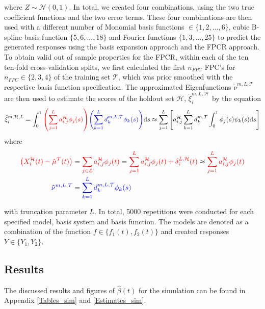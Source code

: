 \documentclass[11pt,twoside,a4paper]{article}
\begin{document}
		where $Z \sim \mathcal{N}(0,1)$. In total, we created four combinations, using the two true coefficient functions and the two error terms. These four combinations are then used with a different number of Monomial basis functions $ \in \{1,2, \dots, 6\}$, cubic B-spline basis-function $\{5,6,...,18\}$ and Fourier functions $\{1,3,...,25\}$ to predict the generated responses using the basis expansion approach and the FPCR approach.
		To obtain valid out of sample properties for the FPCR, within each of the ten ten-fold cross-validation splits, we first calculated the first $n_{FPC}$ FPC's for $n_{FPC} \in \{2,3,4\}$ of the training set $\mathcal{T}$, which was prior smoothed with the respective basis function specification. The approximated Eigenfunctions $\tilde{\nu}^{m, L, \mathcal{T}}$ are then used to estimate the scores of the holdout set $\mathcal{H}$, $\check{\xi}_{i}^{m, L, \mathcal{H}}$  by the equation
		\begin{equation}
			\check{\xi}_{i}^{m, \mathcal{H},L}
			= \int_{0}^{1} {\color{red}\left(\sum_{j = 1}^{L} a_{i,j}^{\mathcal{H}} \phi_j(s)\right)} {\color{blue}\left(\sum_{k = 1}^{L} d_{k}^{m, L, \mathcal{T}} \phi_{k}(s)\right)} \mathrm{d}s
		    \approx \sum_{j = 1}^{L} \left[ a_{i,j}^{\mathcal{H}}\sum_{k = 1}^{L}  d_{k}^{m, \mathcal{T}} \int_{0}^{1} \phi_j(s) \psi_{k}(s)\mathrm{d}s\right]
		\end{equation}
		where 
		\begin{equation}
			\begin{split}
				{\color{red} \left(X_{i}^{\mathcal{H}}(t) - \hat{\mu}^{\mathcal{T}}(t)\right)} 
				&= {\color{red}\sum_{j \in \mathcal{L}} a_{i,j}^{\mathcal{H}} \phi_j(t)}
				= {\color{red}\sum_{j = 1}^{L} a_{i,j}^{\mathcal{H}} \phi_j(t) + \delta_{i}^{L, \mathcal{H}}(t)}
				\approx {\color{red}\sum_{j = 1}^{L} a_{i,j}^{\mathcal{H}} \phi_j(t)} \\
				{\color{blue}\tilde{\nu}^{m, L, \mathcal{T}} } &= {\color{blue}\sum_{k = 1}^{L} d_{k}^{m, L, \mathcal{T}} \phi_{k}(s)}
			\end{split}
		\end{equation}
		
		with truncation parameter $L$. In total, 5000 repetitions were conducted for each specified model, basis system and basis function. The models are denoted as a combination of the function $f \in \{f_1(t), f_2(t)\}$	and created responses $Y \in \{Y_1, Y_2\}$.
		
	\subsection{Results}	
	The discussed results and figures of $\hat{\beta}(t)$ for the simulation can be found in Appendix \ref{Tables_sim} and \ref{Estimates_sim}.
	 
\end{document}

